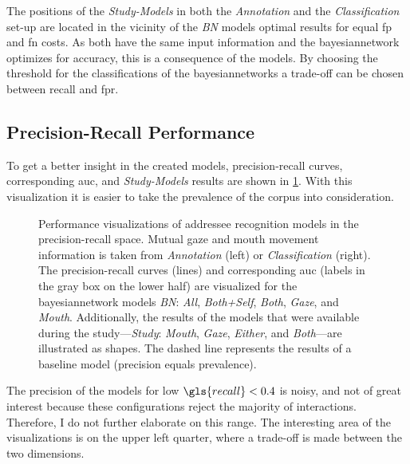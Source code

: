 The positions of the \emph{Study-Models} in both the \emph{Annotation} and the \emph{Classification} set-up are located in the vicinity of the \emph{BN} models optimal results for equal \acrlong{fp} and \acrlong{fn} costs.
As both have the same input information and the \gls{bayesiannetwork} optimizes for \gls{accuracy}, this is a consequence of the models.
By choosing the threshold for the classifications of the \glspl{bayesiannetwork} a trade-off can be chosen between \gls{recall} and \gls{fpr}.

\subsection{Precision-Recall Performance}

To get a better insight in the created models, \gls{precision}-\gls{recall} curves, corresponding \gls{auc}, and \emph{Study-Models} results are shown in \cref{fig:meka-rocpr-models}.
With this visualization it is easier to take the \gls{prevalence} of the corpus into consideration.
\begin{figure}[htb]
    \centering
    
    \vspace{-25pt}
    \caption[Precision-recall of addressee models.]{\label{fig:meka-rocpr-models}
    Performance visualizations of \gls{addressee} recognition models in the \gls{precision}-\gls{recall} space.
    Mutual gaze and mouth movement information is taken from \emph{Annotation} (left) or \emph{Classification} (right).
    The \gls{precision}-\gls{recall} curves (lines) and corresponding \gls{auc} (labels in the gray box on the lower half) are visualized for the \Gls{bayesiannetwork} models \emph{BN}: \emph{All}, \emph{Both+Self}, \emph{Both}, \emph{Gaze}, and \emph{Mouth}.
    Additionally, the results of the models that were available during the study---\emph{Study}: \emph{Mouth}, \emph{Gaze}, \emph{Either}, and \emph{Both}---are illustrated as shapes.
    The dashed line represents the results of a baseline model (\gls{precision} equals \gls{prevalence}).
    }
\end{figure}
The precision of the models for low \(\gls{recall} < 0.4\) is noisy, and not of great interest because these configurations reject the majority of interactions.
Therefore, I do not further elaborate on this range.
The interesting area of the visualizations is on the upper left quarter, where a trade-off is made between the two dimensions.


